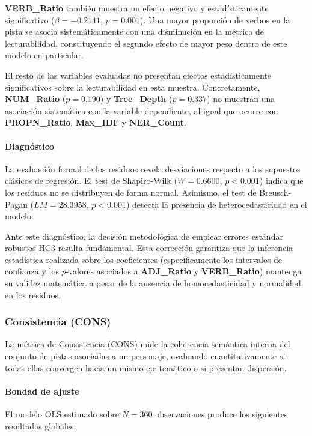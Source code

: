 \textbf{VERB\_Ratio} también muestra un efecto negativo y estadísticamente significativo ($\beta = -0.2141$, $p = 0.001$). Una mayor proporción de verbos en la pista se asocia sistemáticamente con una disminución en la métrica de lecturabilidad, constituyendo el segundo efecto de mayor peso dentro de este modelo en particular.

El resto de las variables evaluadas no presentan efectos estadísticamente significativos sobre la lecturabilidad en esta muestra. Concretamente, \textbf{NUM\_Ratio} ($p = 0.190$) y \textbf{Tree\_Depth} ($p = 0.337$) no muestran una asociación sistemática con la variable dependiente, al igual que ocurre con \textbf{PROPN\_Ratio}, \textbf{Max\_IDF} y \textbf{NER\_Count}.

\paragraph{Diagnóstico}

La evaluación formal de los residuos revela desviaciones respecto a los supuestos clásicos de regresión. El test de Shapiro-Wilk ($W = 0.6600$, $p < 0.001$) indica que los residuos no se distribuyen de forma normal. Asimismo, el test de Breusch-Pagan ($LM = 28.3958$, $p < 0.001$) detecta la presencia de heterocedasticidad en el modelo.

Ante este diagnóstico, la decisión metodológica de emplear errores estándar robustos HC3 resulta fundamental. Esta corrección garantiza que la inferencia estadística realizada sobre los coeficientes (específicamente los intervalos de confianza y los $p$-valores asociados a \textbf{ADJ\_Ratio} y \textbf{VERB\_Ratio}) mantenga su validez matemática a pesar de la ausencia de homocedasticidad y normalidad en los residuos.

\subsubsection{Consistencia (CONS)}

La métrica de Consistencia (CONS) mide la coherencia semántica interna del conjunto de pistas asociadas a un personaje, evaluando cuantitativamente si todas ellas convergen hacia un mismo eje temático o si presentan dispersión.

\paragraph{Bondad de ajuste}

El modelo OLS estimado sobre $N = 360$ observaciones produce los siguientes resultados globales:

